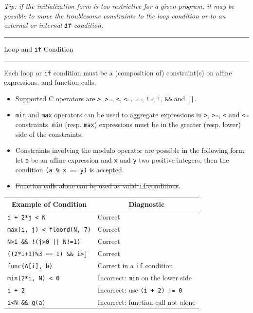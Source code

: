 \documentclass[landscape,a4paper]{article}
\def\titre#1{\begin{center}\hrule\vspace{0.1cm}#1
\vspace{0.07cm}\hrule\end{center}}
\begin{document}
\begin{multicols}{3}
\begin{small}
\vspace{0.3cm}
\textit{Tip: if the initialization form is too restrictive for a given
program, it may be possible to move the troublesome constraints to the
loop condition or to an external or internal {\tt if} condition.}
\end{small}

\titre{Loop and {\tt if} Condition}

\begin{small}
Each loop or {\tt if} condition must be a (composition of) constraint(s) on
affine expressions, \sout{and function calls}.
\begin{itemize} %
\item Supported C operators are {\tt >}, {\tt >=}, {\tt <}, {\tt <=},
      {\tt ==}, {\tt !=}, {\tt !}, {\tt \&\&} and {\tt ||}.
\item {\tt min} and {\tt max} operators can be used to aggregate expressions
      in {\tt >}, {\tt >=}, {\tt <} and {\tt <=} constraints. {\tt min}
      (resp. {\tt max}) expressions must be in the greater (resp. lower)
      side of the constraints.
\item Constraints involving the modulo operator are possible in the following
      form: let {\tt a} be an affine expression and {\tt x} and {\tt y} two
      positive integers, then the condition {\tt (a \% x == y)} is accepted.
\item \sout{Function calls alone can be used as valid {\tt if} conditions}.
\end{itemize}

\vspace{0.3cm}
\begin{tabular}{p{4cm}|p{4.39cm}}
\multicolumn{1}{c|}{Example of Condition} &\multicolumn{1}{c}{Diagnostic}\\
\hline
{\tt i + 2*j < N} & Correct\\
\hline
{\tt max(i, j) < floord(N, 7)} & Correct\\
\hline
{\tt N>i \&\& !(j>0 || N!=1)} & Correct\\
\hline
{\tt ((2*i+1)\%3 == 1) \&\& i>j} & Correct\\
\hline
{\tt func(A[i], b)} & Correct in a {\tt if} condition\\
\hline
\hline
{\tt min(2*i, N) < 0} & Incorrect: {\tt min} on the lower side\\
\hline
{\tt i + 2} & Incorrect: use {\tt (i + 2) != 0}\\
\hline
{\tt i<N \&\& g(a)} & Incorrect: function call not alone
\end{tabular}


\end{small}
\end{multicols}
\end{document}
